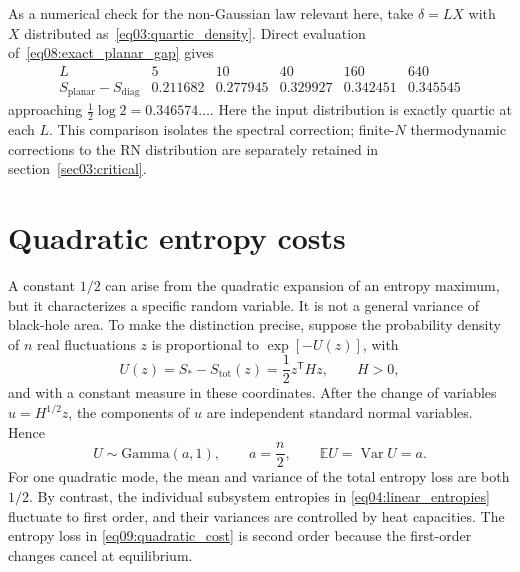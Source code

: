 \documentclass[11pt,letterpaper]{article}
\newcommand{\E}{\mathbb{E}}
\DeclareMathOperator{\Var}{Var}
\theoremstyle{plain}
\theoremstyle{definition}
\theoremstyle{remark}
\begin{document}
As a numerical check for the non-Gaussian law relevant here, take $\delta=LX$ with $X$ distributed as~\eqref{eq03:quartic_density}. Direct evaluation of~\eqref{eq08:exact_planar_gap} gives
\begin{equation}
 \begin{array}{c|ccccc}
 L&5&10&40&160&640\\ \hline
 S_{\mathrm{planar}}-S_{\mathrm{diag}}
 &0.211682&0.277945&0.329927&0.342451&0.345545
 \end{array}
 \label{eq08:quartic_spectral_values}
\end{equation}
approaching $\tfrac12\log2=0.346574\ldots$. Here the input distribution is exactly quartic at each $L$. This comparison isolates the spectral correction; finite-$N$ thermodynamic corrections to the RN distribution are separately retained in section~\ref{sec03:critical}.

\section{Quadratic entropy costs}
\label{app09:cost}

A constant $1/2$ can arise from the quadratic expansion of an entropy maximum, but it characterizes a specific random variable. It is not a general variance of black-hole area. To make the distinction precise, suppose the probability density of $n$ real fluctuations $z$ is proportional to $\exp[-U(z)]$, with
\begin{equation}
 U(z)=S_*-S_{\mathrm{tot}}(z)=\frac12 z^{\mathsf T}Hz,\qquad H>0,
 \label{eq09:quadratic_cost}
\end{equation}
and with a constant measure in these coordinates. After the change of variables $u=H^{1/2}z$, the components of $u$ are independent standard normal variables. Hence
\begin{equation}
 U\sim\mathrm{Gamma}(a,1),\qquad a=\frac n2,\qquad
 \E U=\Var U=a.
 \label{eq09:gamma_cost}
\end{equation}
For one quadratic mode, the mean and variance of the total entropy loss are both $1/2$. By contrast, the individual subsystem entropies in \eqref{eq04:linear_entropies} fluctuate to first order, and their variances are controlled by heat capacities. The entropy loss in \eqref{eq09:quadratic_cost} is second order because the first-order changes cancel at equilibrium.
\end{document}
